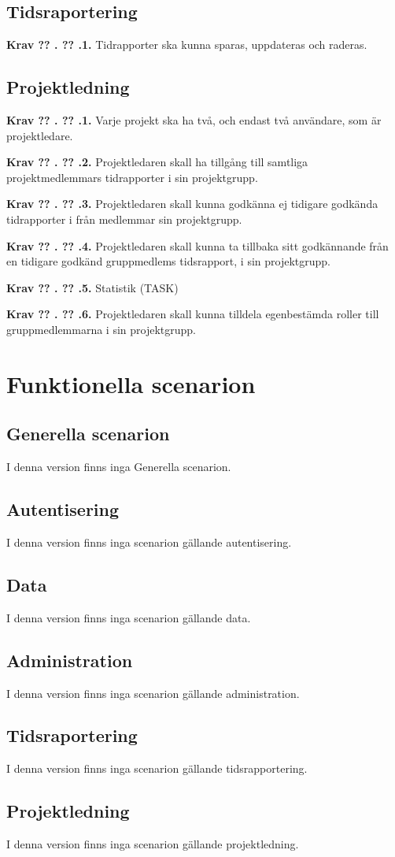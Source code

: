 \documentclass[a4paper]{article}
\newcommand\getcurrentref[1]{%
 \ifnumequal{\value{#1}}{0}
  {??}
  {\the\value{#1}}%
}
\newcommand\requirement[2]{
	\numberedrow{Krav}{#1}{#2}
}
\newcommand\numberedrow[3]{
	\noindent
	\textbf{#1 \getcurrentref{section}.\getcurrentref{subsection}.#2.} #3
	
}
\begin{document}
\subsection{Tidsraportering}
\requirement{1}{Tidrapporter ska kunna sparas, uppdateras och raderas.}
\subsection{Projektledning}
\requirement{1}{Varje projekt ska ha två, och endast två användare, som är projektledare.}
\requirement{2}{Projektledaren skall ha tillgång till samtliga projektmedlemmars tidrapporter i sin projektgrupp.}
\requirement{3}{Projektledaren skall kunna godkänna ej tidigare godkända tidrapporter i från medlemmar sin projektgrupp.}
\requirement{4}{Projektledaren skall kunna ta tillbaka sitt godkännande från en tidigare godkänd gruppmedlems tidsrapport, i sin projektgrupp.}
\requirement{5}{Statistik (TASK)}
\requirement{6}{Projektledaren skall kunna tilldela egenbestämda roller till gruppmedlemmarna i sin projektgrupp.}
\section{Funktionella scenarion}
\label{scenarion}
\subsection{Generella scenarion}
I denna version finns inga Generella scenarion.
\subsection{Autentisering}
I denna version finns inga scenarion gällande autentisering.
\subsection{Data}
I denna version finns inga scenarion gällande data.
\subsection{Administration}
I denna version finns inga scenarion gällande administration.
\subsection{Tidsraportering}
I denna version finns inga scenarion gällande tidsrapportering.
\subsection{Projektledning}
I denna version finns inga scenarion gällande projektledning.
\end{document}
